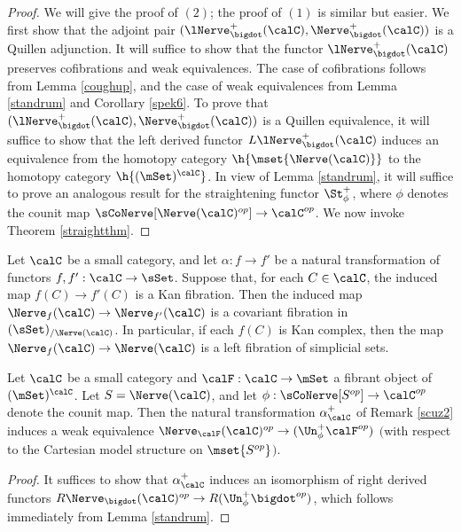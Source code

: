 \begin{proof}
We will give the proof of $(2)$; the proof of $(1)$ is similar but easier. We first show that
the adjoint pair $( \lNerve^{+}_{\bigdot}(\calC), \Nerve^{+}_{\bigdot}(\calC) )$ is a Quillen adjunction.
It will suffice to show that the functor $\lNerve^{+}_{\bigdot}(\calC)$ preserves cofibrations and weak equivalences. The case of cofibrations follows from Lemma \ref{coughup}, and the case of weak
equivalences from Lemma \ref{standrum} and Corollary \ref{spek6}. To prove that
$( \lNerve^{+}_{\bigdot}(\calC), \Nerve^{+}_{\bigdot}(\calC) )$ is a Quillen equivalence, it will suffice to show that the left derived functor $L \lNerve^{+}_{\bigdot}(\calC)$ induces an equivalence from the homotopy category $\h{ \mset{\Nerve(\calC)}}$ to the homotopy category $\h{ (\mSet)^{\calC}}$. In view of Lemma \ref{standrum}, it will suffice to prove an analogous result for the straightening functor
$\St^{+}_{\phi}$, where $\phi$ denotes the counit map
$\sCoNerve[ \Nerve(\calC)^{op}] \rightarrow \calC^{op}$. We now invoke Theorem \ref{straightthm}.
\end{proof}

\begin{corollary}
Let $\calC$ be a small category, and let $\alpha: f \rightarrow f'$ be a natural transformation of functors
$f,f': \calC \rightarrow \sSet$. Suppose that, for each $C \in \calC$, the induced map
$f(C) \rightarrow f'(C)$ is a Kan fibration. Then the induced map
$\Nerve_{f}(\calC) \rightarrow \Nerve_{f'}(\calC)$ is a covariant fibration in
$(\sSet)_{/ \Nerve(\calC)}$. In particular, if each $f(C)$ is Kan complex, then the map
$\Nerve_{f}(\calC) \rightarrow \Nerve(\calC)$ is a left fibration of simplicial sets.
\end{corollary}

\begin{corollary}\label{sandcor}
Let $\calC$ be a small category and $\calF: \calC \rightarrow \mSet$ a fibrant object of
$(\mSet)^{\calC}$. Let $S = \Nerve(\calC)$, and let $\phi: \sCoNerve[S^{op}] \rightarrow \calC^{op}$ denote the counit map. Then the natural transformation $\alpha_{\calC}^{+}$ of Remark \ref{scuz2}
induces a weak equivalence
$\Nerve_{\calF}(\calC)^{op} \rightarrow (\Un^{+}_{\phi} \calF^{op})$
$($with respect to the Cartesian model structure on $\mset{ S^{op}}${}$)$.
\end{corollary}

\begin{proof}
It suffices to show that $\alpha_{\calC}^{+}$ induces an isomorphism of right derived functors
$R \Nerve_{\bigdot}(\calC)^{op} \rightarrow R (\Un^{+}_{\phi} \bigdot^{op})$, which follows immediately from Lemma \ref{standrum}. 
\end{proof}

